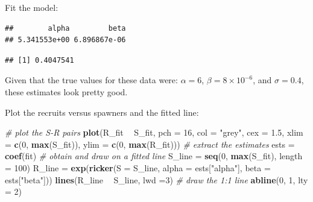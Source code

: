 \documentclass[]{book}
\newenvironment{Shaded}{\begin{snugshade}}{\end{snugshade}}
\newcommand{\KeywordTok}[1]{\textcolor[rgb]{0.13,0.29,0.53}{\textbf{#1}}}
\newcommand{\DataTypeTok}[1]{\textcolor[rgb]{0.13,0.29,0.53}{#1}}
\newcommand{\DecValTok}[1]{\textcolor[rgb]{0.00,0.00,0.81}{#1}}
\newcommand{\FloatTok}[1]{\textcolor[rgb]{0.00,0.00,0.81}{#1}}
\newcommand{\StringTok}[1]{\textcolor[rgb]{0.31,0.60,0.02}{#1}}
\newcommand{\CommentTok}[1]{\textcolor[rgb]{0.56,0.35,0.01}{\textit{#1}}}
\newcommand{\OperatorTok}[1]{\textcolor[rgb]{0.81,0.36,0.00}{\textbf{#1}}}
\newcommand{\NormalTok}[1]{#1}
\theoremstyle{definition}
\theoremstyle{definition}
\theoremstyle{definition}
\theoremstyle{remark}
\begin{document}
Fit the model:

\begin{Shaded}
\end{Shaded}

\begin{verbatim}
##        alpha         beta 
## 5.341553e+00 6.896867e-06
\end{verbatim}

\begin{verbatim}
## [1] 0.4047541
\end{verbatim}

Given that the true values for these data were: \(\alpha = 6\),
\(\beta = 8\times10^{-6}\), and \(\sigma = 0.4\), these estimates look
pretty good.

Plot the recruits versus spawners and the fitted line:

\begin{Shaded}
\begin{Highlighting}[]
\CommentTok{# plot the S-R pairs}
\KeywordTok{plot}\NormalTok{(R_fit }\OperatorTok{~}\StringTok{ }\NormalTok{S_fit, }\DataTypeTok{pch =} \DecValTok{16}\NormalTok{, }\DataTypeTok{col =} \StringTok{"grey"}\NormalTok{, }\DataTypeTok{cex =} \FloatTok{1.5}\NormalTok{,}
     \DataTypeTok{xlim =} \KeywordTok{c}\NormalTok{(}\DecValTok{0}\NormalTok{, }\KeywordTok{max}\NormalTok{(S_fit)), }\DataTypeTok{ylim =} \KeywordTok{c}\NormalTok{(}\DecValTok{0}\NormalTok{, }\KeywordTok{max}\NormalTok{(R_fit)))}
\CommentTok{# extract the estimates}
\NormalTok{ests =}\StringTok{ }\KeywordTok{coef}\NormalTok{(fit)}
\CommentTok{# obtain and draw on a fitted line}
\NormalTok{S_line =}\StringTok{ }\KeywordTok{seq}\NormalTok{(}\DecValTok{0}\NormalTok{, }\KeywordTok{max}\NormalTok{(S_fit), }\DataTypeTok{length =} \DecValTok{100}\NormalTok{)}
\NormalTok{R_line =}\StringTok{ }\KeywordTok{exp}\NormalTok{(}\KeywordTok{ricker}\NormalTok{(}\DataTypeTok{S =}\NormalTok{ S_line,}
                \DataTypeTok{alpha =}\NormalTok{ ests[}\StringTok{"alpha"}\NormalTok{],}
                \DataTypeTok{beta =}\NormalTok{ ests[}\StringTok{"beta"}\NormalTok{]))}
\KeywordTok{lines}\NormalTok{(R_line }\OperatorTok{~}\StringTok{ }\NormalTok{S_line, }\DataTypeTok{lwd =}\DecValTok{3}\NormalTok{)}
\CommentTok{# draw the 1:1 line}
\KeywordTok{abline}\NormalTok{(}\DecValTok{0}\NormalTok{, }\DecValTok{1}\NormalTok{, }\DataTypeTok{lty =} \DecValTok{2}\NormalTok{)}
\end{Highlighting}
\end{Shaded}
\end{document}
